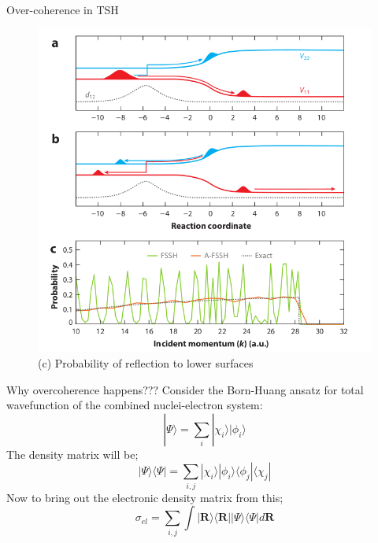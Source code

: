 \documentclass{beamer}
\begin{document}
	\begin{frame}[t]{Over-coherence in TSH}
	\begin{center}
	\begin{figure}
	\includegraphics[scale=0.40]{tully_model_3.png}
	\caption{(c) Probability of reflection to lower
surfaces}
	\end{figure}
	\end{center}
	\end{frame}
	
	\begin{frame}[t]{Why overcoherence happens???}
	Consider the Born-Huang ansatz for total wavefunction of the combined nuclei-electron system:
	\begin{equation}\label{eq:8}
	|\Psi\rangle = \sum_i |\chi_i\rangle|\phi_i\rangle 
	\end{equation}
	The density matrix will be;
	\begin{equation}\label{eq:9}
	|\Psi\rangle\langle\Psi| = \sum_{i,j} |\chi_i\rangle|\phi_i\rangle \langle\phi_j|\langle\chi_j|
	\end{equation}
	Now to bring out the electronic density matrix from this;
	\begin{equation}\label{eq:10}
	\sigma_{el} = \sum_{i,j} \displaystyle\int|\textbf{R}\rangle\langle\textbf{R}||\Psi\rangle\langle\Psi| d\textbf{R}
	\end{equation}
	\end{frame}
\end{document}
